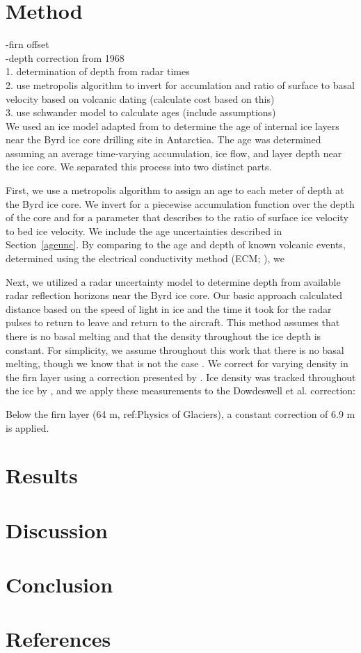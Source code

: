 \documentclass[draft,jgrga]{agutex}
\begin{document}
\section{Method}\label{method}
-firn offset \\
-depth correction from 1968  \\
1. determination of depth from radar times \\
2. use metropolis algorithm to invert for accumlation and ratio of
surface to basal velocity based on volcanic dating (calculate cost
based on this) \\
3. use schwander model to calculate ages (include assumptions)\\


We used an ice model adapted from \citet{Schwander01} to determine the
age of internal ice layers near the Byrd ice core drilling site in
Antarctica. The age was determined assuming an average time-varying
accumulation, ice flow, and layer depth near the ice core. We
separated this process into two distinct parts.

First, we use a metropolis algorithm to assign an age to each meter of
depth at the Byrd ice core. We invert for a piecewise accumulation
function over the depth of the core and for a parameter that describes
to the ratio of surface ice velocity to bed ice velocity. We include
the age uncertainties described in Section~\ref{ageunc}. By
comparing to the age and depth of known volcanic events, determined
using the electrical conductivity method (ECM; \citet{Hammer94}), we





Next, we utilized a radar uncertainty model to determine depth from
available radar reflection horizons near the Byrd ice core. Our basic
approach calculated distance based on the speed of light in ice and
the time it took for the radar pulses to return to leave and return to
the aircraft. This method assumes that there is no basal melting and
that the density throughout the ice depth is constant. For simplicity,
we assume throughout this work that there is no basal melting, though
we know that is not the case \citep{Gow68}. We correct for varying
density in the firn layer using a correction presented by
\citet{Dowdeswell04}. Ice density was tracked throughout the ice by
\citet{Gow68}, and we apply these measurements to the Dowdeswell et
al. correction:


Below the firn layer (64 m, ref:Physics of Glaciers), a constant
correction of 6.9 m is applied.



\section{Results}

\section{Discussion}

\section{Conclusion}

\section{References}



\end{document}
